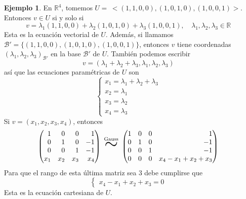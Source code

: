 \documentclass[12pt]{report}
\theoremstyle{definition}
\theoremstyle{definition}
\newtheorem{example}{Ejemplo}[chapter]
\theoremstyle{remark}
\newcommand*{\Scale}[2][4]{\scalebox{#1}{$#2$}}%
\newcommand{\R}{\mathbb R}
\begin{document}
\begin{example}
En $\R^4$, tomemos $U = \ <(1,1,0,0),(1,0,1,0),(1,0,0,1)>$. Entonces $v \in U$ si y solo si
\[v = \lambda_1(1,1,0,0)+\lambda_2(1,0,1,0)+\lambda_3(1,0,0,1), \quad \lambda_1, \lambda_2, \lambda_3 \in \R\]
Esta es la ecuación vectorial de $U$. Además, si llamamos $\mathcal{B}' = \{(1,1,0,0),(1,0,1,0),(1,0,0,1)\}$, entonces $v$ tiene coordenadas $(\lambda_1,\lambda_2,\lambda_3)_{\mathcal{B}'}$ en la base $\mathcal{B}'$ de $U$. También podemos escribir
\[v = (\lambda_1+\lambda_2+\lambda_3,\lambda_1,\lambda_2,\lambda_3)\]
así que las ecuaciones paramétricas de $U$ son
\[
\begin{cases}
    x_1 = \lambda_1+\lambda_2+\lambda_3 \\
    x_2 = \lambda_1 \\
    x_3 = \lambda_2 \\
    x_4 = \lambda_3
\end{cases}
\]
Si $v = (x_1,x_2,x_3,x_4)$, entonces
\[
\begin{pmatrix*}[r]
    1 & 0 & 0 & 1 \\
    0 & 1 & 0 & -1 \\
    0 & 0 & 1 & -1 \\
    x_1 & x_2 & x_3 & x_4 
\end{pmatrix*}
\ \overset{\textrm{\scriptsize Gauss}}{\Scale[2.5]{\sim}} \
\begin{pmatrix*}[r]
    1 & 0 & 0 & 1 \\
    0 & 1 & 0 & -1 \\
    0 & 0 & 1 & -1 \\
    0 & 0 & 0 & x_4-x_1+x_2+x_3
\end{pmatrix*}
\]
Para que el rango de esta última matriz sea $3$ debe cumplirse que
\[
\begin{cases}
    x_4-x_1+x_2+x_3=0
\end{cases}\]
Esta es la ecuación cartesiana de $U$.
\end{example}
\end{document}
